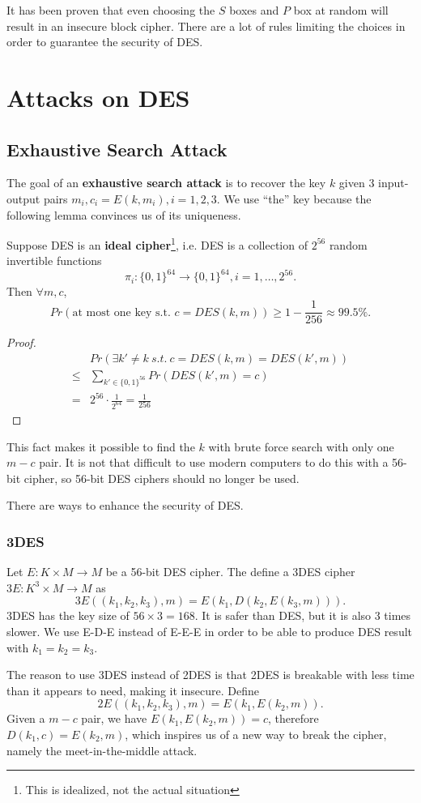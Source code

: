 It has been proven that even choosing the $S$ boxes and $P$ box at random will result in an insecure block cipher. There are a lot of rules limiting the choices in order to guarantee the security of DES.
\section{Attacks on DES}
\subsection{Exhaustive Search Attack}
The goal of an \textbf{exhaustive search attack} is to recover the key $k$ given 3 input-output pairs $m_i,c_i=E(k,m_i),i=1,2,3.$ We use ``the'' key because the following lemma convinces us of its uniqueness.
\begin{lemma}
Suppose DES is an \textbf{ideal cipher}\footnote{This is idealized, not the actual situation}, i.e. DES is a collection of $2^{56}$ random invertible functions 
\[\pi_i:\{0,1\}^{64}\rightarrow\{0,1\}^{64},i=1,\dots,2^{56}.\]
Then $\forall m,c$, 
\[Pr(\text{at most one key s.t. $c=DES(k,m)$})\geq 1-\frac{1}{256}\approx 99.5\%.\]
\end{lemma}
\begin{proof}
\begin{align*}
&Pr(\exists k'\neq k\:s.t.\:c=DES(k,m)=DES(k',m))\\
\leq&\sum\limits_{k'\in\{0,1\}^{56}}Pr(DES(k',m)=c)\\
=&2^{56}\cdot\frac{1}{2^{64}}=\frac{1}{256}
\end{align*}
\end{proof}
This fact makes it possible to find the $k$ with brute force search with only one $m-c$ pair. It is not that difficult to use modern computers to do this with a 56-bit cipher, so 56-bit DES ciphers should no longer be used. 

There are ways to enhance the security of DES. 
\subsubsection{3DES}
Let $E:K\times M\rightarrow M$ be a 56-bit DES cipher. The define a 3DES cipher $3E:K^{3}\times M\rightarrow M$ as 
\[3E((k_1,k_2,k_3),m)=E(k_1,D(k_2,E(k_3,m))).\]
3DES has the key size of $56\times 3=168$. It is safer than DES, but it is also 3 times slower. We use E-D-E instead of E-E-E in order to be able to produce DES result with $k_1=k_2=k_3$.

The reason to use 3DES instead of 2DES is that 2DES is breakable with less time than it appears to need, making it insecure. Define 
\[2E((k_1,k_2,k_3),m)=E(k_1,E(k_2,m)).\]
Given a $m-c$ pair, we have 
$E(k_1,E(k_2,m))=c$, therefore $D(k_1,c)=E(k_2,m)$, which inspires us of a new way to break the cipher, namely the meet-in-the-middle attack. 

